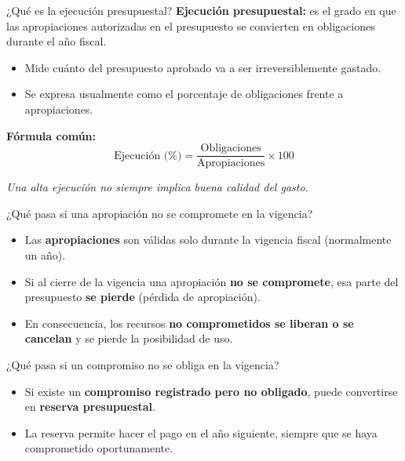 \begin{frame}{¿Qué es la ejecución presupuestal?}
\textbf{Ejecución presupuestal:} es el grado en que las apropiaciones autorizadas en el presupuesto se convierten en obligaciones durante el año fiscal.

\vspace{1em}
\begin{itemize}
  \item Mide cuánto del presupuesto aprobado va a ser irreversiblemente gastado.
  \item Se expresa usualmente como el porcentaje de obligaciones frente a apropiaciones.
\end{itemize}

\vspace{1em}
\textbf{Fórmula común:}
\begin{equation*}
\text{Ejecución (\%)} = \frac{\text{Obligaciones}}{\text{Apropiaciones}} \times 100
\end{equation*}

\vspace{1em}
\textit{Una alta ejecución no siempre implica buena calidad del gasto.}
\end{frame}

\begin{frame}{¿Qué pasa si una apropiación no se compromete en la vigencia?}
\begin{itemize}
  \item Las \textbf{apropiaciones} son válidas solo durante la vigencia fiscal (normalmente un año).
  \item Si al cierre de la vigencia una apropiación \textbf{no se compromete}, esa parte del presupuesto \textbf{se pierde} (pérdida de apropiación).
  \item En consecuencia, los recursos \textbf{no comprometidos se liberan o se cancelan} y se pierde la posibilidad de uso.
\end{itemize}
\end{frame}

\begin{frame}{¿Qué pasa si un compromiso no se obliga en la vigencia?}
\begin{itemize}
  \item Si existe un \textbf{compromiso registrado pero no obligado}, puede convertirse en \textbf{reserva presupuestal}.
  \item La reserva permite hacer el pago en el año siguiente, siempre que se haya comprometido oportunamente.
\end{itemize}
\end{frame}

